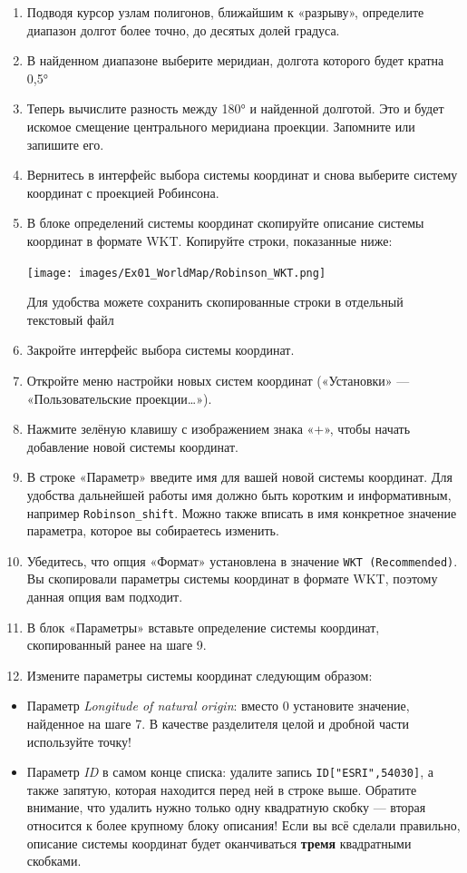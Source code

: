 \documentclass[
  12pt,
]{book}
\providecommand{\tightlist}{%
  \setlength{\itemsep}{0pt}\setlength{\parskip}{0pt}}
\begin{document}
\begin{enumerate}
\def\labelenumi{\arabic{enumi}.}
\setcounter{enumi}{4}
\item
  Подводя курсор узлам полигонов, ближайшим к «разрыву», определите диапазон долгот более точно, до десятых долей градуса.
\item
  В найденном диапазоне выберите меридиан, долгота которого будет кратна 0,5°
\item
  Теперь вычислите разность между 180° и найденной долготой. Это и будет искомое смещение центрального меридиана проекции. Запомните или запишите его.
\item
  Вернитесь в интерфейс выбора системы координат и снова выберите систему координат с проекцией Робинсона.
\item
  В блоке определений системы координат скопируйте описание системы координат в формате WKT. Копируйте строки, показанные ниже:

  \texttt{[image: images/Ex01\_WorldMap/Robinson\_WKT.png]}

  Для удобства можете сохранить скопированные строки в отдельный текстовый файл
\item
  Закройте интерфейс выбора системы координат.
\item
  Откройте меню настройки новых систем координат («Установки» --- «Пользовательские проекции\ldots»).
\item
  Нажмите зелёную клавишу с изображением знака «+», чтобы начать добавление новой системы координат.
\item
  В строке «Параметр» введите имя для вашей новой системы координат. Для удобства дальнейшей работы имя должно быть коротким и информативным, например \texttt{Robinson\_shift}. Можно также вписать в имя конкретное значение параметра, которое вы собираетесь изменить.
\item
  Убедитесь, что опция «Формат» установлена в значение \texttt{WKT\ (Recommended)}. Вы скопировали параметры системы координат в формате WKT, поэтому данная опция вам подходит.
\item
  В блок «Параметры» вставьте определение системы координат, скопированный ранее на шаге 9.
\item
  Измените параметры системы координат следующим образом:
\end{enumerate}

\begin{itemize}
\tightlist
\item
  Параметр \emph{Longitude of natural origin}: вместо 0 установите значение, найденное на шаге 7. В качестве разделителя целой и дробной части используйте точку!
\item
  Параметр \emph{ID} в самом конце списка: удалите запись \texttt{ID{[}"ESRI",54030{]}}, а также запятую, которая находится перед ней в строке выше. Обратите внимание, что удалить нужно только одну квадратную скобку --- вторая относится к более крупному блоку описания! Если вы всё сделали правильно, описание системы координат будет оканчиваться \textbf{тремя} квадратными скобками.
\end{itemize}
\end{document}
